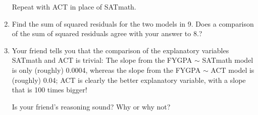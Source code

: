 \documentclass[12pt]{report}
\begin{document}
\begin{enumerate}
\noindent Repeat with ACT in place of SATmath.

\item Find the sum of squared residuals for the two models in 9. Does a comparison of the sum of squared residuals agree with your answer to 8.?

\item Your friend tells you that the comparison of the explanatory variables SATmath and ACT is trivial: The slope from the FYGPA $\sim$ SATmath model is only (roughly) 0.0004, whereas the slope from the FYGPA $\sim$ ACT model is (roughly) 0.04; ACT is clearly the better explanatory variable, with a slope that is 100 times bigger!

Is your friend's reasoning sound? Why or why not?
\end{enumerate}
\end{document}
